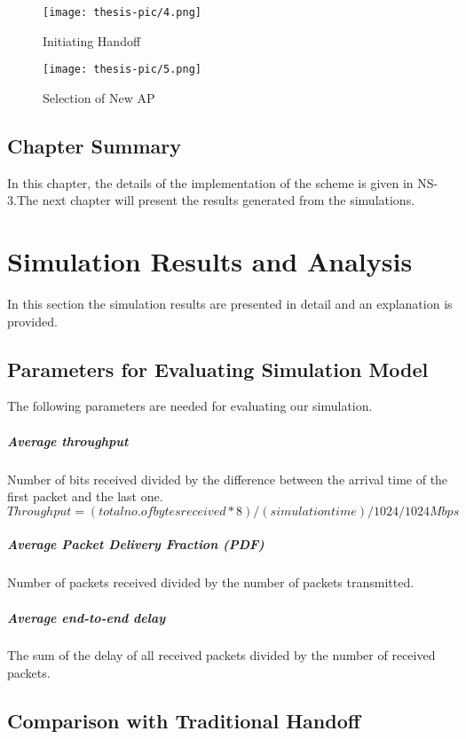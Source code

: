 \documentclass[12pt,a4paper]{report}
\begin{document}
\begin{center}
\begin{figure}[H]
\centering
\texttt{[image: thesis-pic/4.png]}
\caption{Initiating Handoff}
\end{figure}
\end{center}


\begin{figure}[H]
\centering
\texttt{[image: thesis-pic/5.png]}
\caption{Selection of New AP}
\end{figure}


\section{Chapter Summary}
In this chapter, the details of the implementation of the scheme is given in NS-3.The next chapter will present the results generated from the simulations.

\chapter{Simulation Results and Analysis}
In this section the simulation results are presented in detail and an explanation is provided.
\section{Parameters for Evaluating Simulation Model}
The following parameters are needed for evaluating our simulation.
\paragraph{Average throughput}
Number of bits received divided by the difference between the arrival time of the first packet and the last one.
$$Throughput=(total no.of bytes received *8)/(simulation time)/1024/1024 Mbps $$
\paragraph{Average Packet Delivery Fraction (PDF)}
Number of packets received divided by the number of packets transmitted.
\paragraph{Average end-to-end delay}
 The sum of the delay of all received packets divided by the number of received packets.
\section{Comparison with Traditional Handoff}
\end{document}
